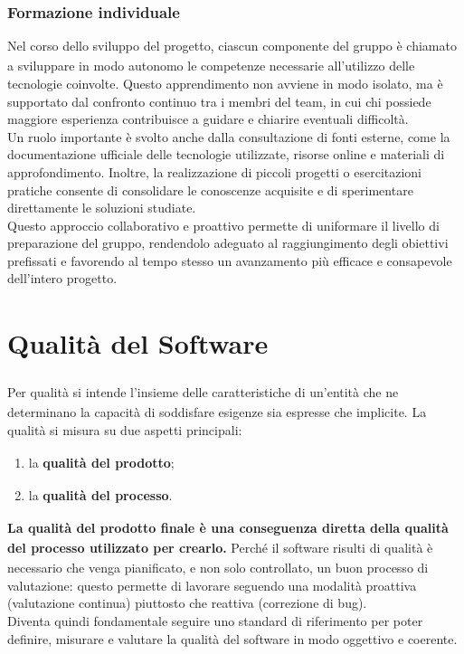 \documentclass[a4paper,11pt]{article}
\newcommand{\G}{\textsubscript{\scalebox{0.6}{\textbf{G}}}}
\begin{document}
\subsubsection{Formazione individuale}
Nel corso dello sviluppo del progetto\G{}, ciascun componente del gruppo è chiamato a sviluppare in modo autonomo le competenze necessarie 
all'utilizzo delle tecnologie coinvolte. Questo apprendimento non avviene in modo isolato, ma è supportato dal confronto continuo tra 
i membri del team, in cui chi possiede maggiore esperienza contribuisce a guidare e chiarire eventuali difficoltà. \\
Un ruolo importante è svolto anche dalla consultazione di fonti esterne, come la documentazione ufficiale delle tecnologie utilizzate, 
risorse online e materiali di approfondimento. Inoltre, la realizzazione di piccoli progetti o esercitazioni pratiche consente di 
consolidare le conoscenze acquisite e di sperimentare direttamente le soluzioni studiate.\\
Questo approccio collaborativo e proattivo permette di uniformare il livello di preparazione del gruppo, rendendolo adeguato al 
raggiungimento degli obiettivi prefissati e favorendo al tempo stesso un avanzamento più efficace e consapevole dell'intero progetto\G{}.







\section{Qualità\G{} del Software}

Per qualità\G{} si intende l'insieme delle caratteristiche di un'entità che ne determinano la capacità di soddisfare esigenze sia espresse che implicite. La qualità\G{} si misura su due aspetti principali: 
\begin{enumerate}
    \item la \textbf{qualità\G{} del prodotto\G{}};
    \item la \textbf{qualità\G{} del processo}.
\end{enumerate}
\textbf{La qualità\G{} del prodotto\G{} finale è una conseguenza diretta della qualità\G{} del processo utilizzato per crearlo.}
Perché il software risulti di qualità\G{} è necessario che venga pianificato, e non solo controllato, un buon processo di valutazione: questo permette di lavorare seguendo una modalità proattiva (valutazione continua) piuttosto che reattiva (correzione di bug).\\
Diventa quindi fondamentale seguire uno standard di riferimento per poter definire, misurare e valutare la qualità\G{} del software in modo oggettivo e coerente.
\end{document}
